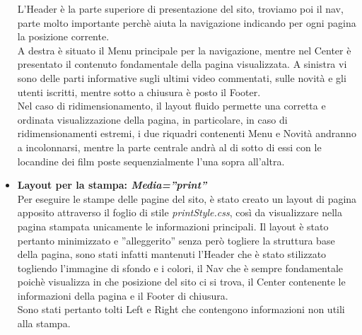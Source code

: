 \begin{itemize}
L'Header è la parte superiore di presentazione del sito, troviamo poi il nav, parte molto importante perchè aiuta la navigazione indicando per ogni pagina la posizione corrente.\\
A destra è situato il Menu principale per la navigazione, mentre nel Center è presentato il contenuto fondamentale della pagina visualizzata. A sinistra vi sono delle parti informative sugli ultimi video commentati, sulle novità e gli utenti iscritti, mentre sotto a chiusura è posto il Footer.\\
Nel caso di ridimensionamento, il layout fluido permette una corretta e ordinata visualizzazione della pagina, in particolare, in caso di ridimensionamenti estremi, i due riquadri contenenti Menu e Novità andranno a incolonnarsi, mentre la parte centrale andrà al di sotto di essi con le locandine dei film poste sequenzialmente l'una sopra all'altra.

\item \textbf{Layout per la stampa: \textit{Media=''print''}}\\
Per eseguire le stampe delle pagine del sito, è stato creato un layout di pagina apposito attraverso il foglio di stile \textit{printStyle.css}, così da visualizzare nella pagina stampata unicamente le informazioni principali. Il layout è stato pertanto minimizzato e ''alleggerito'' senza però togliere la struttura base della pagina, sono stati infatti mantenuti l'Header che è stato stilizzato togliendo l'immagine di sfondo e i colori, il Nav che è sempre fondamentale poichè visualizza in che posizione del sito ci si trova, il Center contenente le informazioni della pagina e il Footer di chiusura.\\
Sono stati pertanto tolti Left e Right che contengono informazioni non utili alla stampa.


 


\end{itemize}
